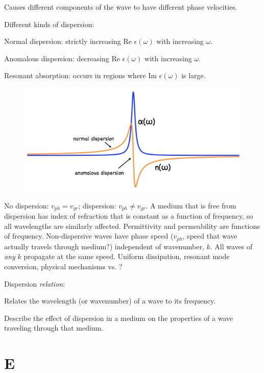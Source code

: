 \documentclass[12pt]{article}
\begin{document}
Causes different components of the wave to have different phase velocities.

Different kinds of dispersion:
\begin{itemize*}
    \item Normal dispersion: strictly increasing Re $\epsilon(\omega)$ with
        increasing $\omega$.
    \item Anomalous dispersion: decreasing Re $\epsilon(\omega)$ with
        increasing $\omega$.
    \item Resonant absorption: occurs in regions where Im $\epsilon(\omega)$
        is large.
\end{itemize*}

\begin{figure}[h]
    \centering
    \includegraphics[width=5in]{disp.png}
\end{figure}

No dispersion: $v_{ph} = v_{gr}$; dispersion: $v_{ph} \neq v_{gr}$.
A medium that is free from dispersion has index of refraction that is constant
as a function of frequency, so all wavelengths are similarly affected.
Permittivity and permeability are functions of frequency.
Non-dispersive waves have phase speed ($v_{ph}$, speed that wave actually travels
through medium?) independent of wavenumber, $k$.
All waves of \emph{any} $k$ propagate at the same speed.
Uniform dissipation, resonant mode conversion, physical mechanisms vs. ?

Dispersion \emph{relation}:
\begin{itemize*}
    \item Relates the wavelength (or wavenumber) of a wave to its
        frequency.
    \item Describe the effect of dispersion in a medium on the properties
        of a wave traveling through that medium.
\end{itemize*}

\section*{E}
\end{document}
